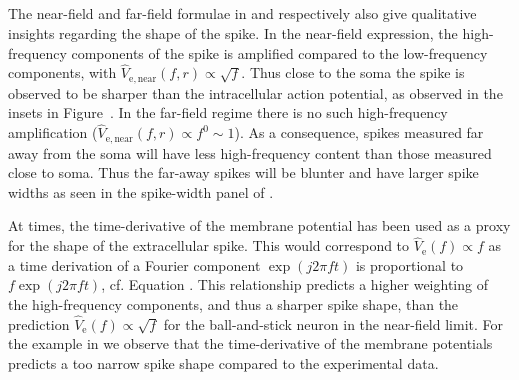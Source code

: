 \subsection{}
The near-field and far-field formulae in  and  respectively also give qualitative insights regarding the shape of the spike. In the near-field expression, the high-frequency components of the spike is amplified compared to the low-frequency components, with $\hat{V}_\mathrm{e,near}(f,r) \propto \sqrt{f}$.
Thus close to the soma the spike is observed to be sharper than the intracellular action potential,
as observed in the insets in Figure~.  
In the far-field regime there is no such high-frequency amplification ($\hat{V}_\mathrm{e,near}(f,r) \propto f^0 \sim 1$).
As a consequence, spikes measured far away from the soma will have less high-frequency content than those measured close to soma.
Thus the far-away spikes will be blunter and have larger spike widths as seen in the spike-width panel of 
.

At times, the time-derivative of the membrane potential has been used as a proxy for the shape of the extracellular spike.
This would correspond to  $\hat{V}_\mathrm{e}(f) \propto f$ as a time derivation of a Fourier component   
$\exp (j 2 \pi f t)$  is proportional to $f \exp (j 2 \pi f t)$, cf. Equation . This relationship predicts a higher weighting of the high-frequency components, and thus a sharper spike shape, than the  prediction $\hat{V}_\mathrm{e}(f) \propto \sqrt{f}$ for the ball-and-stick neuron in the near-field limit. For the example in  we observe that the time-derivative of the membrane potentials predicts a too narrow spike shape compared to the experimental data.


